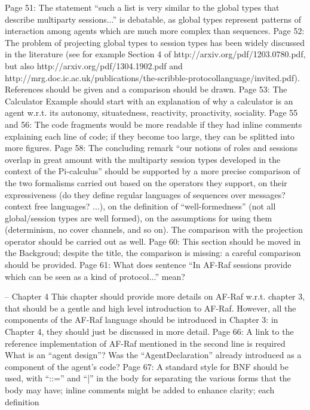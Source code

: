 \documentclass{article}
\newenvironment{them}{\noindent\begingroup\color{blue}}{\endgroup\par}
\begin{document}
\begin{them}
Page 51:
The statement “such a list is very similar to the global types that describe multiparty sessions...” is
debatable, as global types represent patterns of interaction among agents which are much more
complex than sequences.
Page 52:
The problem of projecting global types to session types has been widely discussed in the literature
(see for example Section 4 of http://arxiv.org/pdf/1203.0780.pdf, but also
http://arxiv.org/pdf/1304.1902.pdf and http://mrg.doc.ic.ac.uk/publications/the-scribble-protocollanguage/invited.pdf).
References should be given and a comparison should be drawn.
Page 53:
The Calculator Example should start with an explanation of why a calculator is an agent w.r.t. its
autonomy, situatedness, reactivity, proactivity, sociality.
Page 55 and 56:
The code fragments would be more readable if they had inline comments explaining each line of
code; if they become too large, they can be splitted into more figures.
Page 58:
The concluding remark “our notions of roles and sessions overlap in great amount with the
multiparty session types developed in the context of the Pi-calculus” should be supported by a more
precise comparison of the two formalisms carried out based on the operators they support, on their
expressiveness (do they define regular languages of sequences over messages? context free
languages? ...), on the definition of “well-formedness” (not all global/session types are well formed),
on the assumptions for using them (determinism, no cover channels, and so on). The comparison
with the projection operator should be carried out as well.
Page 60:
This section should be moved in the Backgroud; despite the title, the comparison is missing: a careful
comparison should be provided.
Page 61:
What does sentence “In AF-Raf sessions provide which can be seen as a kind of protocol...” mean?
\end{them}
-- Chapter 4
This chapter should provide more details on AF-Raf w.r.t. chapter 3, that should be a gentle and high
level introduction to AF-Raf. However, all the components of the AF-Raf language should be
introduced in Chapter 3: in Chapter 4, they should just be discussed in more detail.
Page 66:
A link to the reference implementation of AF-Raf mentioned in the second line is required
What is an “agent design”? Was the “AgentDeclaration” already introduced as a component of the
agent's code?
Page 67:
A standard style for BNF should be used, with “::=” and “|” in the body for separating the various
forms that the body may have; inline comments might be added to enhance clarity; each definition
\end{document}
